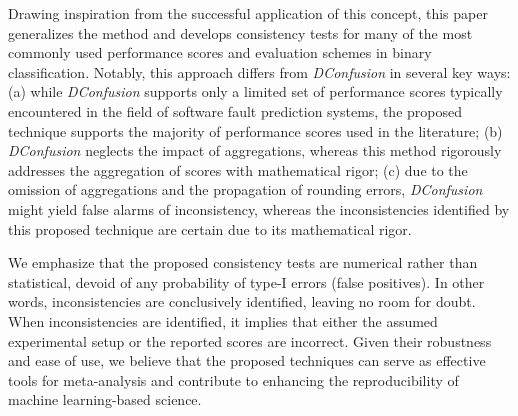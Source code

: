 \documentclass[5p, final]{elsarticle}
\begin{document}
Drawing inspiration from the successful application of this concept, this paper generalizes the method and develops consistency tests for many of the most commonly used performance scores and evaluation schemes in binary classification. Notably, this approach differs from \emph{DConfusion} \cite{dconfusion} in several key ways: (a) while \emph{DConfusion} supports only a limited set of performance scores typically encountered in the field of software fault prediction systems, the proposed technique supports the majority of performance scores used in the literature; (b) \emph{DConfusion} neglects the impact of aggregations, whereas this method rigorously addresses the aggregation of scores with mathematical rigor; (c) due to the omission of aggregations and the propagation of rounding errors, \emph{DConfusion} might yield false alarms of inconsistency, whereas the inconsistencies identified by this proposed technique are certain due to its mathematical rigor.

We emphasize that the proposed consistency tests are numerical rather than statistical, devoid of any probability of type-I errors (false positives). In other words, inconsistencies are conclusively identified, leaving no room for doubt. When inconsistencies are identified, it implies that either the assumed experimental setup or the reported scores are incorrect. Given their robustness and ease of use, we believe that the proposed techniques can serve as effective tools for meta-analysis and contribute to enhancing the reproducibility of machine learning-based science.
\end{document}
